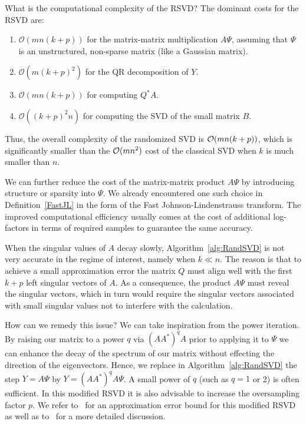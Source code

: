 What is the computational complexity of the RSVD? The dominant costs for the RSVD are:
\begin{enumerate}
\item ${\mathcal O}(m n (k + p)) $ for the matrix-matrix multiplication $ A \Psi $, assuming that $\Psi$ is an unstructured, non-sparse matrix (like a Gaussian matrix).
\item $ {\mathcal O}(m (k + p)^2) $ for the QR decomposition of $ Y $.
\item ${\mathcal O}(mn (k + p))$  for computing $Q^{\ast} A$.
\item  ${\mathcal O}((k + p)^2 n) $ for computing the  SVD of the small matrix $ B $.
\end{enumerate}
Thus, the overall complexity of the randomized SVD is ${\mathcal{O}}(m n (k + p)) $, which is significantly smaller than
the $ {\mathcal{O}}(m n^2) $ cost of the classical SVD when $ k $ is much smaller than $ n $.

We can further reduce the cost of the matrix-matrix product  $ A \Psi $ by introducing structure or sparsity into $\Psi$. We already encountered one such choice in Definition~\ref{FastJL} in the form of the Fast Johnson-Lindenstrauss transform. The improved computational efficiency usually comes at the cost of additional log-factors in terms of required samples to guarantee the same accuracy.


When the singular values of $A$ decay slowly, Algorithm~\ref{alg:RandSVD} is not very accurate in the regime of interest, namely when $k \ll n$. The reason is that to achieve a small approximation error the matrix $Q$ must align well with the first $k + p$ left singular vectors of $A$. As a consequence, the product $A\Psi$ must reveal
the singular vectors, which in turn would require the singular vectors associated with small singular values not to interfere with the calculation. 

How can we remedy this issue? We can take inspiration from the power iteration. 
By raising our matrix to a power $q$ via $(AA^{\ast} )^q A$ prior to applying it to $\Psi$ we can enhance the decay of the 
spectrum of our matrix without effecting the direction of the eigenvectors. Hence, we replace in Algorithm~\ref{alg:RandSVD} the step $Y = A \Psi$ by $Y = (AA^{\ast} )^q A \Psi$.
A small power of $q$ (such as $q=1$ or 2) is often sufficient. In this modified RSVD  it is also advisable to increase the oversampling factor $p$. We refer to~\cite[Corollary 10.10]{HMT11} for an approximation error bound for this modified RSVD as well as to~\cite{tropp2023randomized} for a more detailed discussion.

